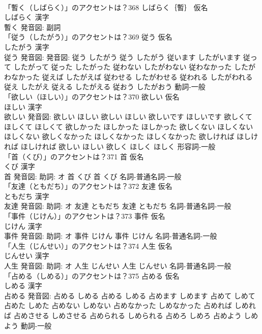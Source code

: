 \documentclass[8pt]{extreport}
\begin{document}
\begin{CJK}{UTF8}{min}
\\	「暫く（しばらく）」のアクセントは？368	しばらく｛暫｝ 仮名　
\\	しばらく 漢字　
\\	暫く 発音図:							副詞 
\\	「従う（したがう）」のアクセントは？369	従う 仮名　
\\	したがう 漢字　
\\	従う 発音図: 発音図:	従う したがう		従う したがう 従います したがいます 従って したがって 従った したがった 従わない したがわない 従わなかった したがわなかった 従えば したがえば 従わせる したがわせる 従われる したがわれる 従え したがえ 従える したがえる 従おう したがおう				動詞-一般 
\\	「欲しい（ほしい）」のアクセントは？370	欲しい 仮名　
\\	ほしい 漢字　
\\	欲しい 発音図:	欲しい ほしい		欲しい ほしい 欲しいです ほしいです 欲しくて ほしくて ほしくて 欲しかった ほしかった ほしかった 欲しくない ほしくない ほしくない 欲しくなかった ほしくなかった ほしくなかった 欲しければ ほしければ ほしければ 欲しい ほしい 欲しく ほしく ほしく				形容詞-一般 
\\	「首（くび）」のアクセントは？371	首 仮名　
\\	くび 漢字　
\\	首 発音図: 助詞: オ	首 くび		首 くび				名詞-普通名詞-一般 
\\	「友達（ともだち）」のアクセントは？372	友達 仮名　
\\	ともだち 漢字　
\\	友達 発音図: 助詞: オ	友達 ともだち		友達 ともだち				名詞-普通名詞-一般 
\\	「事件（じけん）」のアクセントは？373	事件 仮名　
\\	じけん 漢字　
\\	事件 発音図: 助詞: オ	事件 じけん		事件 じけん				名詞-普通名詞-一般 
\\	「人生（じんせい）」のアクセントは？374	人生 仮名　
\\	じんせい 漢字　
\\	人生 発音図: 助詞: オ	人生 じんせい		人生 じんせい				名詞-普通名詞-一般 
\\	「占める（しめる）」のアクセントは？375	占める 仮名　
\\	しめる 漢字　
\\	占める 発音図:	占める しめる		占める しめる 占めます しめます 占めて しめて 占めた しめた 占めない しめない 占めなかった しめなかった 占めれば しめれば 占めさせる しめさせる 占められる しめられる 占めろ しめろ 占めよう しめよう				動詞-一般 

\end{CJK}
\end{document}
